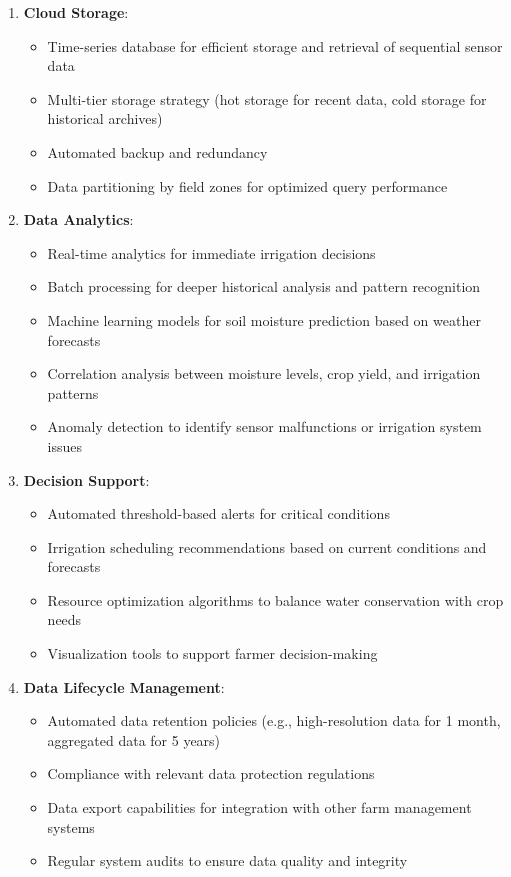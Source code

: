 \documentclass[12pt,a4paper]{article}
\begin{document}
\begin{enumerate}
    \item \textbf{Cloud Storage}:
    \begin{itemize}
        \item Time-series database for efficient storage and retrieval of sequential sensor data
        \item Multi-tier storage strategy (hot storage for recent data, cold storage for historical archives)
        \item Automated backup and redundancy
        \item Data partitioning by field zones for optimized query performance
    \end{itemize}
    
    \item \textbf{Data Analytics}:
    \begin{itemize}
        \item Real-time analytics for immediate irrigation decisions
        \item Batch processing for deeper historical analysis and pattern recognition
        \item Machine learning models for soil moisture prediction based on weather forecasts
        \item Correlation analysis between moisture levels, crop yield, and irrigation patterns
        \item Anomaly detection to identify sensor malfunctions or irrigation system issues
    \end{itemize}
    
    \item \textbf{Decision Support}:
    \begin{itemize}
        \item Automated threshold-based alerts for critical conditions
        \item Irrigation scheduling recommendations based on current conditions and forecasts
        \item Resource optimization algorithms to balance water conservation with crop needs
        \item Visualization tools to support farmer decision-making
    \end{itemize}
    
    \item \textbf{Data Lifecycle Management}:
    \begin{itemize}
        \item Automated data retention policies (e.g., high-resolution data for 1 month, aggregated data for 5 years)
        \item Compliance with relevant data protection regulations
        \item Data export capabilities for integration with other farm management systems
        \item Regular system audits to ensure data quality and integrity
    \end{itemize}
\end{enumerate}
\end{document}

